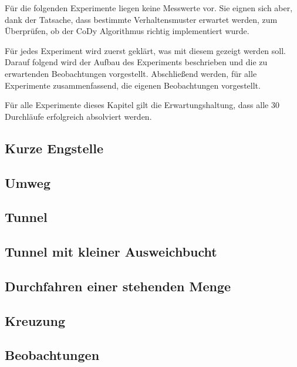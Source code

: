 Für die folgenden Experimente liegen keine Messwerte vor. Sie eignen sich aber, dank der Tatsache, dass bestimmte Verhaltensmuster erwartet werden, zum Überprüfen, ob der CoDy Algorithmus richtig implementiert wurde.

Für jedes Experiment wird zuerst geklärt, was mit diesem gezeigt werden soll. Darauf folgend wird der Aufbau des Experiments beschrieben und die zu erwartenden Beobachtungen vorgestellt. Abschließend werden, für alle Experimente zusammenfassend, die eigenen Beobachtungen vorgestellt.

Für alle Experimente dieses Kapitel gilt die Erwartungshaltung, dass alle 30 Durchläufe erfolgreich absolviert werden.

%
\subsection{Kurze Engstelle}
\label{chap:engstelle}

%
\subsection{Umweg}
\label{chap:umweg}

%
\subsection{Tunnel}
\label{chap:tunnel}

%
\subsection{Tunnel mit kleiner Ausweichbucht}
\label{chap:ausweichbucht}

%
\subsection{Durchfahren einer stehenden Menge}
\label{chap:menge}

%
\subsection{Kreuzung}
\label{chap:kreuzung}

%
\subsection{Beobachtungen}
\label{chap:beobachtungen}

